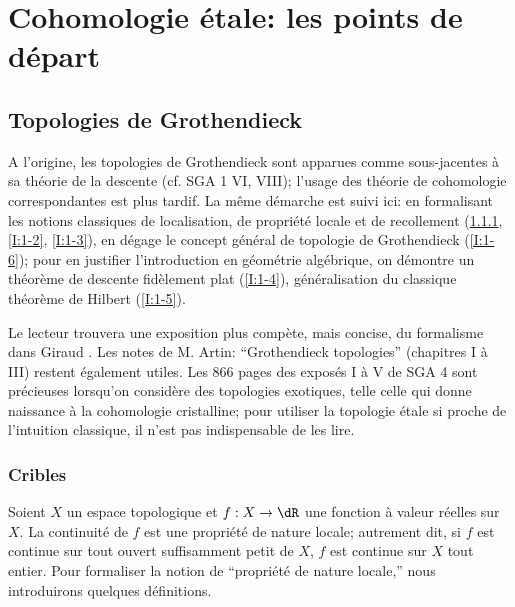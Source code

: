
\chapter{Cohomologie étale: les points de départ}\label{I}




















\section{Topologies de Grothendieck}\label{I:1}

A l'origine, les topologies de Grothendieck sont apparues comme sous-jacentes 
à sa théorie de la descente (cf. SGA 1 VI, VIII); l'usage des théorie de 
cohomologie correspondantes est plus tardif. La même démarche est suivi 
ici: en formalisant les notions classiques de localisation, de propriété 
locale et de recollement (\ref{I:1-1}, \ref{I:1-2}, \ref{I:1-3}), en dégage le 
concept général de topologie de Grothendieck (\ref{I:1-6}); pour en justifier 
l'introduction en géométrie algébrique, on démontre un théorème 
de descente fidèlement plat (\ref{I:1-4}), généralisation du classique théorème 
de Hilbert (\ref{I:1-5}). 

Le lecteur trouvera une exposition plus compète, mais concise, du 
formalisme dans Giraud \cite{gi64}. Les notes de M. Artin: ``Grothendieck 
topologies'' \cite{ar62} (chapitres I à III) restent également utiles. Les 
866 pages des exposés I à V de SGA 4 sont précieuses lorsqu'on 
considère des topologies exotiques, telle celle qui donne naissance à la 
cohomologie cristalline; pour utiliser la topologie étale si proche de 
l'intuition classique, il n'est pas indispensable de les lire. 










\subsection{Cribles}\label{I:1-1}

Soient $X$ un espace topologique et $f:X\to \dR$ une fonction à valeur 
réelles sur $X$. La continuité de $f$ est une propriété de nature 
locale; autrement dit, si $f$ est continue sur tout ouvert suffisamment petit 
de $X$, $f$ est continue sur $X$ tout entier. Pour formaliser la notion de 
``propriété de nature locale,'' nous introduirons quelques définitions.

